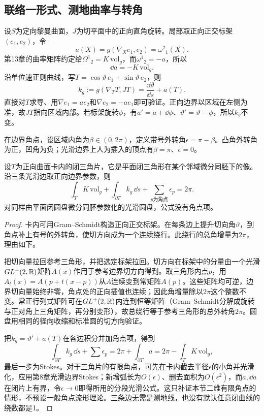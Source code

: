 \subsection*{联络一形式、测地曲率与转角}
设$S$为定向黎曼曲面，$J$为切平面中的正向直角旋转。局部取正向正交标架$(e_1,e_2)$，令
\[
 a(X)=g(\nabla_Xe_1,e_2)=\omega^2{}_1(X).
\]
第13章的曲率矩阵约定给$\Omega^1{}_2=K\,\mathrm{vol}_g$，而$\omega^1{}_2=-a$，所以
\[
 \dd a=-K\,\mathrm{vol}_g.
\]
沿单位速正则曲线，写$T=\cos\vartheta\,e_1+\sin\vartheta\,e_2$，则
\[
 k_g:=g(\nabla_TT,JT)=\frac{\dd\vartheta}{\dd s}+a(T).
\]
直接对$T$求导、用$\nabla e_1=ae_2$和$\nabla e_2=-ae_1$即可验证。正向边界以区域在左侧为准，故$JT$指向区域内部。若标架旋转$\phi$，有$a'=a+\dd\phi$、$\vartheta'=\vartheta-\phi$，所以$k_g$不变。

在边界角点，设区域内角为$\beta\in(0,2\pi)$，定义带号外转角$\epsilon=\pi-\beta$。凸角外转角为正，凹角为负；光滑边界上人为插入的顶点有$\beta=\pi$、$\epsilon=0$。

\begin{lemma}\label{lem:local-gauss-bonnet}
设$T$为正向曲面卡内的闭三角片，它是平面闭三角形在某个邻域微分同胚下的像。沿三条光滑边取正向边界参数，则
\[
 \int_T K\,\mathrm{vol}_g+\int_{\partial T}k_g\,\dd s
        +\sum_{p\text{为角点}}\epsilon_p=2\pi.
\]
对同样由平面闭圆盘微分同胚参数化的光滑圆盘，公式没有角点项。
\end{lemma}
\begin{proof}
卡内可用Gram--Schmidt构造正向正交标架。在每条边上提升切向角$\vartheta$，到角点补上有号的外转角，使切方向成为一个连续绕行。此绕行的总角增量为$2\pi$，理由如下。

把切向量拉回参考三角形，并把选定标架拉回。切方向在标架中的分量由一个光滑$GL^+(2,\mathbb{R})$矩阵$A(x)$作用于参考边界切方向得到。取三角形内点$p$，用$A_t(x)=A(p+t(x-p))$从$A$连续变到常矩阵$A(p)$。这些矩阵均可逆，边界切向量始终非零，角点处的正向插值也连续；因此角增量除以$2\pi$这个整数不变。常正行列式矩阵可在$GL^+(2,\mathbb{R})$内连到恒等矩阵（Gram--Schmidt分解成旋转与正对角上三角矩阵，再分别变形），故总绕行等于参考三角形的总外转角$2\pi$。圆盘用相同的径向收缩和标准圆的切方向验证。

把$k_g=\vartheta'+a(T)$在各边积分并加角点项，得到
\[
 \int_{\partial T}k_g\,\dd s+\sum\epsilon_p
 =2\pi+\int_{\partial T}a
 =2\pi-\int_TK\,\mathrm{vol}_g,
\]
最后一步为Stokes。对于三角片的有限角点，可先在卡内截去半径$\epsilon$的小角并光滑化，应用第8章光滑边界Stokes；新增弧长为$O(\epsilon)$、删去面积为$O(\epsilon^2)$，而$a,\dd a$在闭片上有界，令$\epsilon\to0$即得所用的分段光滑公式。这只补证本节二维有限角点的情形，不预设一般角点流形理论。三条边无需是测地线，也没有默认任意闭曲线的绕数都是1。
\end{proof}

